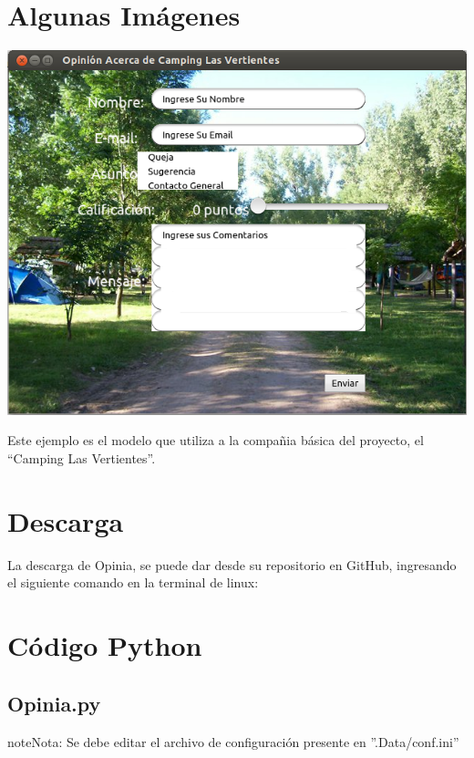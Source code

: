 \documentclass[letterpaper,10pt,spanish]{sphinxmanual}
\begin{document}
\section{Algunas Imágenes}
\label{Opinia:algunas-imagenes}
\includegraphics{Opinia.png}

Este ejemplo es el modelo que utiliza a la compañia básica del proyecto, el ``Camping Las Vertientes''.


\section{Descarga}
\label{Opinia:descarga}
La descarga de Opinia, se puede dar desde su repositorio en GitHub, ingresando el siguiente comando en la terminal de linux:


\section{Código Python}
\label{Opinia:codigo-python}

\subsection{Opinia.py}
\label{Opinia:opinia-py}
\begin{notice}{note}{Nota:}
Se debe editar el archivo de configuración presente en ''.Data/conf.ini''
\end{notice}
\end{document}
